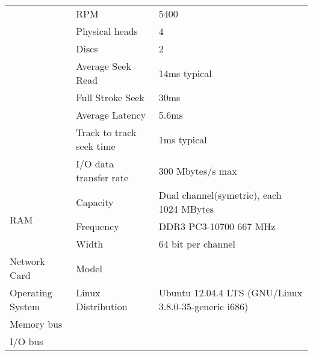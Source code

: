 \documentclass{article} %
\begin{document}
\begin{table}[h]
\begin{tabular}{|l|l|l|}
                                       & RPM                      & 5400                                                           \\ \cline{2-3}
                                       & Physical heads           & 4                                                              \\ \cline{2-3}
                                       & Discs                    & 2                                                              \\ \cline{2-3}
                                       & Average Seek Read        & 14ms typical                                                   \\ \cline{2-3}
                                       & Full Stroke Seek         & 30ms                                                           \\ \cline{2-3}
                                       & Average Latency          & 5.6ms                                                          \\ \cline{2-3}
                                       & Track to track seek time & 1ms typical                                                    \\ \cline{2-3}
                                       & I/O data transfer rate   & 300 Mbytes/s max                                               \\ \cline{2-3}
    \hline
    \multirow{3}{*}{RAM}               & Capacity                 & Dual channel(symetric), each 1024 MBytes                       \\ \cline{2-3}
                                       & Frequency                & DDR3 PC3-10700 667 MHz                                         \\ \cline{2-3}
                                       & Width                    & 64 bit per channel                                             \\ \cline{2-3}
    \hline
    \multirow{1}{*}{Network Card}      & Model                    &                                                                \\ \cline{2-3}
    \hline
    \multirow{1}{*}{Operating System}  & Linux Distribution       & Ubuntu 12.04.4 LTS (GNU/Linux 3.8.0-35-generic i686)           \\ \cline{2-3}
    \hline
    Memory bus                         &                          &                                                                \\
    \hline
    I/O bus                            &                          &                                                                \\
    \hline
  \end{tabular}
\end{table}
\end{document}

